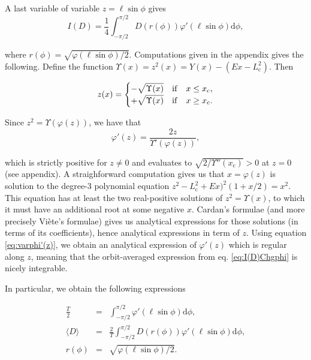 \documentclass[11pt]{article}
\newcommand{\rc}{\mathrm{c}}
\newcommand{\rd}{{\mathrm{d}}}
\newcommand{\Lc}{L_{{\mathrm{c}}}}
\newcommand{\xc}{x_{\rc}}
\begin{document}
A last variable of variable $z=\ell\sin\phi$ gives
\begin{equation}
I(D) = \frac{1}{4}\int_{-\pi/2}^{\pi/2}  D(r(\phi))\varphi'(\ell\sin\phi)\rd \phi ,
\label{eq:I(D)Chgphi}
\end{equation}

where $r(\phi)=\sqrt{\varphi(\ell\sin\phi)/2}$. Computations given in the appendix gives the following. Define the function $\Upsilon(x)=z^{2}(x)=Y(x)-(E x-\Lc^{2})$. Then

\begin{equation}
  z(x)=\begin{cases}
\displaystyle{ -\sqrt{\Upsilon(x)}} & {\rm{if}} \quad x\leq\xc ,\\
\displaystyle{ +\sqrt{\Upsilon(x)}} &{\rm{if}} \quad x\geq\xc .
\end{cases}
  \label{eq:z(x)}
\end{equation}

Since $z^{2}=\Upsilon(\varphi(z))$, we have that
\begin{equation}
\varphi'(z) = \frac{2 z}{\Upsilon'(\varphi(z))} ,
  \label{eq:varphi'(z)}
\end{equation}

which is strictly positive for $z\neq0$ and evaluates to $\sqrt{2/\Upsilon''(\xc)}>0$ at $z=0$ (see appendix). A straighforward computation gives us that $x=\varphi(z)$ is solution to the degree-3 polynomial equation $z^{2}-\Lc^{2} + Ex)^{2}(1+x/2)=x^{2}$. This equation has at least the two real-positive solutions of $z^{2}=\Upsilon(x)$, to which it must have an additional root at some negative $x$. Cardan's formulae (and more precisely Viète's formulae) gives us analytical expressions for those solutions (in terms of its coefficients), hence analytical expressions in term of $z$. Using equation \eqref{eq:varphi'(z)}, we obtain an analytical expression of $\varphi'(z)$ which is regular along $z$, meaning that the orbit-averaged expression from eq. \eqref{eq:I(D)Chgphi} is nicely integrable.

In particular, we obtain the following expressions

\begin{equation}
  \boxed{
    \begin{array}{ccl}
      \displaystyle{\frac{T}{2}} &=& \displaystyle{\int_{-\pi/2}^{\pi/2}\varphi'(\ell\sin\phi)\rd \phi},\\
      \displaystyle{\langle D\rangle} &=& \displaystyle{\frac{2}{T}\int_{-\pi/2}^{\pi/2}D(r(\phi))\varphi'(\ell\sin\phi)\rd \phi}, \\
      r(\phi) &=& \sqrt{\varphi(\ell\sin\phi)/2}.
    \end{array}
  }
  \label{eq:periodAndOAD}
 \end{equation}
\end{document}
